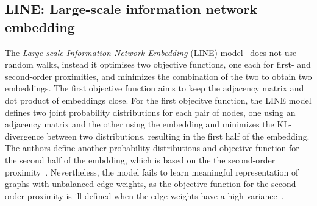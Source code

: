 \subsection{LINE: Large-scale information network embedding}
\label{subsec:LINE}
The \emph{Large-scale Information Network Embedding} (LINE) model~ does not use random walks, instead it optimises two objective functions, one each for first- and second-order proximities, and minimizes the combination of the two to obtain two embeddings. The first objective function aims to keep the adjacency matrix and dot product of embeddings close. For the first objecitve function, the LINE model defines two joint probability distributions for each pair of nodes, one using an adjacency matrix and the other using the embedding and minimizes the KL-divergence between two distributions, resulting in the first half of the embedding. The authors define another probability distributions and objective function for the second half of the embdding, which is based on the the second-order proximity~. Nevertheless, the model fails to learn meaningful representation of graphs with unbalanced edge weights, as the objective function for the second-order proximity is ill-defined when the edge weights have a high variance~.
